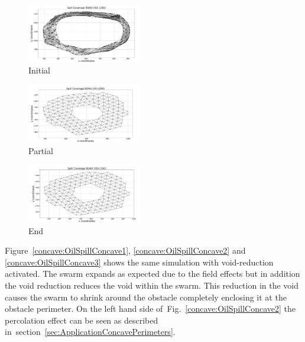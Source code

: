 \documentclass[preprint,12pt]{elsarticle}
\begin{document}
\begin{figure}
\begin{center}
\includegraphics[width=5cm]{figures/OilSpillBase1}
\end{center}
\caption{Initial\label{concave:OilSpillBase1}}
\end{figure}
\begin{figure}
\begin{center}
\includegraphics[width=5cm]{figures/OilSpillBase2}
\end{center}
\caption{Partial\label{concave:OilSpillBase2}}
\end{figure}
\begin{figure}
\begin{center}
\includegraphics[width=5cm]{figures/OilSpillBase3}
\end{center}
\caption{End\label{concave:OilSpillBase3}}
\end{figure}

Figure~\ref{concave:OilSpillConcave1}, \ref{concave:OilSpillConcave2} and \ref{concave:OilSpillConcave3} shows the same simulation with void-reduction activated. The swarm expands as expected due to the field effects but in addition the void reduction reduces the void within the swarm. This reduction in the void causes the swarm to shrink around the obstacle completely enclosing it at the obstacle perimeter. On the left hand side of~Fig.~\ref{concave:OilSpillConcave2} the percolation effect can be seen as described in~section~\ref{sec:ApplicationConcavePerimeters}.
\end{document}
